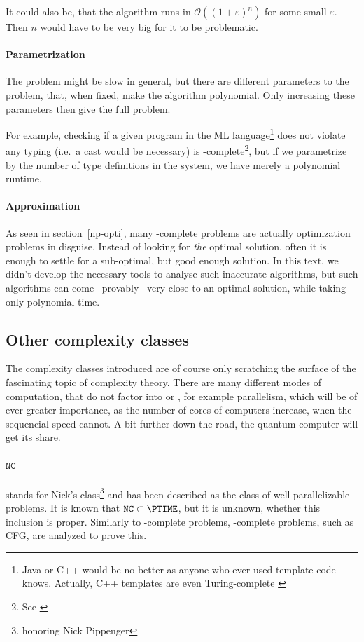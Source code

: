 It could also be, that the algorithm runs in $\mathcal{O}((1+\varepsilon)^n)$ 
for some small $\varepsilon$. Then $n$ would have to be very big for it to be problematic.
\paragraph{Parametrization}
The problem might be slow in general, but there are different parameters to 
the problem, that, when fixed, make the algorithm polynomial. Only increasing 
these parameters then give the full problem. 

For example, checking if a given program in the ML language\footnote{Java or
	C++ would be no better as anyone who ever used template code knows. Actually,
	C++ templates are even Turing-complete \cite{veldhuizen2003c++}}
does not violate any typing (i.e.\ a cast would be necessary) is
\NPTIME-complete\footnote{See \cite{downey1999parameterized}}, but if we
parametrize by the number of type definitions in the system, we have merely a
polynomial runtime.
\paragraph{Approximation}
As seen in section~\ref{np-opti}, many \NPTIME-complete problems are actually
optimization problems in disguise. Instead of looking for \emph{the} optimal
solution, often it is enough to settle for a sub-optimal, but good enough
solution.  In this text, we didn't develop the necessary tools to analyse such
inaccurate algorithms, but such algorithms can come --provably-- very close to
an optimal solution, while taking only polynomial time.

\subsection{Other complexity classes}
The complexity classes introduced are of course only scratching the surface 
of the fascinating topic of complexity theory. There are many different modes 
of computation, that do not factor into \PTIME or \NPTIME, for example 
parallelism, which will be of ever greater importance, as the number of cores 
of computers increase, when the sequencial speed cannot. A bit further down 
the road, the quantum computer will get its share.

\paragraph{$\mathtt{NC}$}
stands for Nick's class\footnote{honoring Nick Pippenger} and
has been described as the class of well-parallelizable 
problems\citationneeded. It is known that $\mathtt{NC} \subset \PTIME$, but it is unknown, 
whether this inclusion is proper. Similarly to \NPTIME-complete problems, 
\PTIME-complete problems, such as CFG, are analyzed to prove this. 

